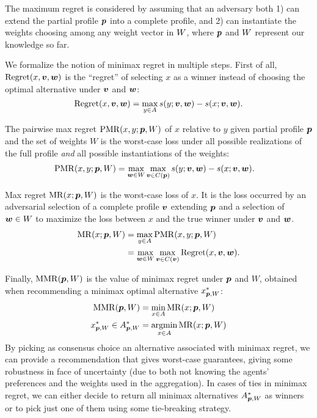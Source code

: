 The maximum regret is considered by assuming that an adversary both 1) can extend the partial profile ${\bm{p}}$ into a complete profile, and 2) can instantiate the weights choosing among any weight vector in $W$, where ${\bm{p}}$ and $W$ represent our knowledge so far.

We formalize the notion of minimax regret in multiple steps.
First of all, $\operatorname{Regret}(x, \bm{v}, \bm{w})$ is the “regret” of selecting $x$ as a winner instead of choosing the optimal alternative under $\bm{v}$ and $\bm{w}$:
\[\operatorname{Regret}(x, \bm{v}, \bm{w}) = \max_{y \in A} s(y; \bm{v},\bm{w}) - s(x; \bm{v}, \bm{w}).\]

The pairwise max regret $\operatorname{PMR}(x,y;{\bm{p}},W)$ of $x$ relative to $y$ given partial profile ${\bm{p}}$ and the set of weights $W$
is the worst-case loss under all possible realizations of the full profile {\em and} all possible instantiations of the weights:
\begin{align}
\operatorname{PMR}(x,y; {\bm{p}}, W) & = \max_{\bm{w} \in W} \max_{\bm{v} \in C({\bm{p}})} s(y; \bm{v},\bm{w}) - s(x; \bm{v},\bm{w}).
\end{align}

Max regret $\operatorname{MR}(x;{\bm{p}},W)$ is the worst-case loss of $x$. It is the loss occurred by an adversarial selection of a complete profile $\bm{v}$ extending ${\bm{p}}$ and a selection of $\bm{w} \in W$ to maximize the loss between $x$ and the true winner under $\bm{v}$ and $\bm{w}$.
\begin{align}
\operatorname{MR}(x; {\bm{p}}, W) & = \max_{y \in A} \operatorname{PMR}(x,y; {\bm{p}}, W)\\
& = \max_{\bm{w} \in W} \max_{\bm{v} \in C(\bm{v})} \operatorname{Regret}(x, \bm{v}, \bm{w}).
\end{align}

Finally,  $\operatorname{MMR}({\bm{p}},W)$ is the value of minimax regret under ${\bm{p}}$ and $W$, obtained when recommending a minimax optimal alternative $x^*_{{\bm{p}}, W}$:
\begin{align*}
\operatorname{MMR}({\bm{p}},W) & = \min_{x \in A} \operatorname{MR}(x;{\bm{p}},W) \\
x^{*}_{{\bm{p}},W} \in A^*_{{\bm{p}}, W} & = \operatorname*{argmin}_{x \in A} \operatorname{MR}(x;{\bm{p}},W) 
\end{align*}
By picking as consensus choice
 an alternative associated with minimax regret, we can provide a recommendation that gives worst-case guarantees, giving some robustness in face of uncertainty (due to both not knowing the agents' preferences and the weights used in the aggregation). 
In cases of ties in minimax regret, we can either decide to return all minimax alternatives $A^*_{{\bm{p}}, W}$ as winners or to pick just one of them using some tie-breaking strategy.

